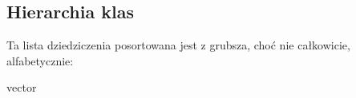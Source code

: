 \subsection{Hierarchia klas}
Ta lista dziedziczenia posortowana jest z grubsza, choć nie całkowicie, alfabetycznie\-:\begin{DoxyCompactList}
\item {}
\item vector\begin{DoxyCompactList}
\item {}
\begin{DoxyCompactList}
\item {}
\end{DoxyCompactList}
\end{DoxyCompactList}
\end{DoxyCompactList}
